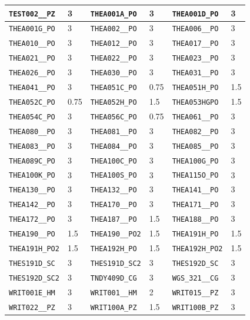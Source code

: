 \begin{longtable}{|l|l||l|l||l|l|}
    \verb|TEST002__PZ| & 3 & \verb|THEA001A_PO| & 3 & \verb|THEA001D_PO| & 3\\\hline
    \verb|THEA001G_PO| & 3 & \verb|THEA002__PO| & 3 & \verb|THEA006__PO| & 3\\\hline
    \verb|THEA010__PO| & 3 & \verb|THEA012__PO| & 3 & \verb|THEA017__PO| & 3\\\hline
    \verb|THEA021__PO| & 3 & \verb|THEA022__PO| & 3 & \verb|THEA023__PO| & 3\\\hline
    \verb|THEA026__PO| & 3 & \verb|THEA030__PO| & 3 & \verb|THEA031__PO| & 3\\\hline
    \verb|THEA041__PO| & 3 & \verb|THEA051C_PO| & 0.75 & \verb|THEA051H_PO| & 1.5\\\hline
    \verb|THEA052C_PO| & 0.75 & \verb|THEA052H_PO| & 1.5 & \verb|THEA053HGPO| & 1.5\\\hline
    \verb|THEA054C_PO| & 3 & \verb|THEA056C_PO| & 0.75 & \verb|THEA061__PO| & 3\\\hline
    \verb|THEA080__PO| & 3 & \verb|THEA081__PO| & 3 & \verb|THEA082__PO| & 3\\\hline
    \verb|THEA083__PO| & 3 & \verb|THEA084__PO| & 3 & \verb|THEA085__PO| & 3\\\hline
    \verb|THEA089C_PO| & 3 & \verb|THEA100C_PO| & 3 & \verb|THEA100G_PO| & 3\\\hline
    \verb|THEA100K_PO| & 3 & \verb|THEA100S_PO| & 3 & \verb|THEA115O_PO| & 3\\\hline
    \verb|THEA130__PO| & 3 & \verb|THEA132__PO| & 3 & \verb|THEA141__PO| & 3\\\hline
    \verb|THEA142__PO| & 3 & \verb|THEA170__PO| & 3 & \verb|THEA171__PO| & 3\\\hline
    \verb|THEA172__PO| & 3 & \verb|THEA187__PO| & 1.5 & \verb|THEA188__PO| & 3\\\hline
    \verb|THEA190__PO| & 1.5 & \verb|THEA190__PO2| & 1.5 & \verb|THEA191H_PO| & 1.5\\\hline
    \verb|THEA191H_PO2| & 1.5 & \verb|THEA192H_PO| & 1.5 & \verb|THEA192H_PO2| & 1.5\\\hline
    \verb|THES191D_SC| & 3 & \verb|THES191D_SC2| & 3 & \verb|THES192D_SC| & 3\\\hline
    \verb|THES192D_SC2| & 3 & \verb|TNDY409D_CG| & 3 & \verb|WGS_321__CG| & 3\\\hline
    \verb|WRIT001E_HM| & 3 & \verb|WRIT001__HM| & 2 & \verb|WRIT015__PZ| & 3\\\hline
    \verb|WRIT022__PZ| & 3 & \verb|WRIT100A_PZ| & 1.5 & \verb|WRIT100B_PZ| & 3\\\hline

\end{longtable}
